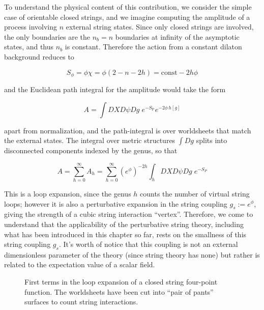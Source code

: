 To understand the physical content of this contribution, we consider the simple case of orientable closed strings, and we imagine computing the amplitude of a process involving $n$ external string states. Since only closed strings are involved, the only boundaries are the $n_b = n$ boundaries at infinity of the asymptotic states, and thus $n_b$ is constant. Therefore the action from a constant dilaton background reduces to

\begin{equation}
	S_\phi = \phi \chi = \phi(2 - n - 2h) = \text{const} - 2h\phi
	\label{}
\end{equation}

and the Euclidean path integral for the amplitude would take the form

\begin{equation}
	A = \int DX D\psi Dg \; e^{-S_\text{P}} e^{-2\phi \, h[g]}
	\label{}
\end{equation}

apart from normalization, and the path-integral is over worldsheets that match the external states. The integral over metric structures $\int Dg$ splits into disconnected components indexed by the genus, so that

\begin{equation}
	A = \sum_{h=0}^{\infty} A_h = \sum_{h=0}^\infty (e^\phi)^{-2h} \int_h DX D\psi Dg \; e^{-S_P}
	\label{perturbationseries}
\end{equation}

This is a loop expansion, since the genus $h$ counts the number of virtual string loops; however it is also a perturbative expansion in the string coupling $g_s := e^\phi$, giving the strength of a cubic string interaction ``vertex''. Therefore, we come to understand that the applicability of the perturbative string theory, including what has been introduced in this chapter so far, rests on the smallness of this string coupling $g_s$. It's worth of notice that this coupling is not an external dimensionless parameter of the theory (since string theory has none) but rather is related to the expectation value of a scalar field.

\begin{figure}[h!]
\centering
\def\svgwidth{300pt}
\captionsetup{width=0.8\textwidth}

\caption{First terms in the loop expansion of a closed string four-point function. The worldsheets have been cut into ``pair of pants'' surfaces to count string interactions.} \label{loopfigure}
\end{figure}


